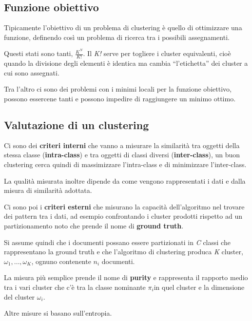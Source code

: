 \subsection{Funzione obiettivo}\label{funzione-obiettivo}

Tipicamente l'obiettivo di un problema di clustering è quello di
ottimizzare una funzione, definendo così un problema di ricerca tra i
possibili assegnamenti.

Questi stati sono tanti, $\frac{K^N}{K!}$. Il \emph{K!} serve per togliere i
cluster equivalenti, cioè quando la divisione degli elementi è identica
ma cambia ``l'etichetta'' dei cluster a cui sono assegnati.

Tra l'altro ci sono dei problemi con i minimi locali per la funzione
obiettivo, possono essercene tanti e possono impedire di raggiungere un
minimo ottimo.

\subsection{Valutazione di un clustering}\label{valutazione-di-un-clustering}

Ci sono dei \textbf{criteri interni} che vanno a misurare la similarità
tra oggetti della stessa classe (\textbf{intra-class}) e tra oggetti di
classi diversi (\textbf{inter-class}), un buon clustering cerca quindi
di massimizzare l'intra-class e di minimizzare l'inter-class.

La qualità misurata inoltre dipende da come vengono rappresentati i dati
e dalla misura di similarità adottata.

Ci sono poi i \textbf{criteri esterni} che misurano la capacità dell'algoritmo nel trovare dei pattern tra i dati, ad esempio confrontando i cluster prodotti rispetto ad un partizionamento noto che prende  il nome di \textbf{ground truth}.

Si assume quindi che i documenti possano essere partizionati in \emph{C}
classi che rappresentano la ground truth e che l'algoritmo di clustering
produca \emph{K} cluster, $\omega_1, \ldots, \omega_K$, ognuno contenente
$n_i$ documenti.

La misura più semplice prende il nome di \textbf{purity} e rappresenta
il rapporto medio tra i vari cluster che c'è tra la classe nominante $\pi_i$in
quel cluster e la dimensione del cluster $\omega_i$.

Altre misure si basano sull'entropia.


